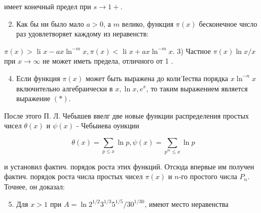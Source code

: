 \documentclass[10pt]{article}
\begin{document}
имеет конечный предел при $s \rightarrow 1+$.



\begin{enumerate}

  \setcounter{enumi}{1}

  \item Как бы ни было мало $a>0$, а $m$ велико, функция $\pi(x)$ бесконечное чнсло раз удовлетворяет каждому из неравенств:

\end{enumerate}



$\pi(x)>$ li $x-a x \ln ^{-m} x, \pi(x)<$ li $x+a x \ln ^{-m} x$. 3) Частное $\pi(x) \ln x / x$ при $x \rightarrow \infty$ не может иметь предела, отличного от 1 .



\begin{enumerate}

  \setcounter{enumi}{3}

  \item Если функция $\pi(x)$ может быть выражена до коли'Іества порядка $x \ln ^{-n} x$ включительно алгебраически в $x, \ln x, e^{x}$, то таким выражением является выражение $(*)$.

\end{enumerate}



После этого П. Л. Чебышев ввелг две новые функции распределения простых чисел $\theta(x)$ и $\psi(x)$ - Чебыиева оункции



\[

\theta(x)=\sum_{p \leqslant x} \ln p, \psi(x)=\sum_{p^{m} \leqslant x} \ln p

\]



и установил фактич. порядок роста этих функций. Отсюда впервые им получен фактич. порядок роста числа простых чисел $\pi(x)$ и $n$-го простого числа $P_{n}$. Точнее, он доказал:



\begin{enumerate}

  \setcounter{enumi}{4}

  \item Для $x>1$ при $A=\ln 2^{1 / 2} 3^{1 / 3} 5^{1 / 5} / 30^{1 / 30}$, имеют место неравенства

\end{enumerate}
\end{document}
